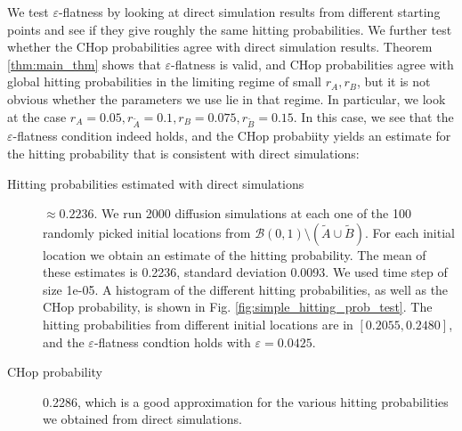 


We test $\varepsilon$-flatness by looking at direct simulation results from different starting points and see if they give roughly the same hitting probabilities. We further test whether the CHop probabilities agree with direct simulation results. Theorem \ref{thm:main_thm} shows that $\varepsilon$-flatness is valid, and CHop probabilities agree with global hitting probabilities in the limiting regime of small $r_A,r_B$, but it is not obvious whether the parameters we use lie in that regime.  In particular, we look at the case $r_A = 0.05, r_{\tilde{A}} = 0.1, r_B = 0.075, r_{\tilde{B}} = 0.15$. In this case, we see that the $\varepsilon$-flatness condition indeed holds, and the CHop probabiity yields an estimate for the hitting probability that is consistent with direct simulations:

\begin{description}
\item[Hitting probabilities estimated with direct simulations] $\approx 0.2236$. We run 2000 diffusion simulations at each one of the 100 randomly picked initial locations from $\mathcal{B}(0, 1) \setminus (\tilde{A} \cup \tilde{B})$. For each initial location we obtain an estimate of the hitting probability. The mean of these estimates is 0.2236, standard deviation 0.0093. We used time step of size 1e-05. A histogram of the different hitting probabilities, as well as the CHop probability, is shown in Fig. \ref{fig:simple_hitting_prob_test}. The hitting probabilities from different initial locations are in $[0.2055, 0.2480]$, and the $\varepsilon$-flatness condtion holds with $\varepsilon = 0.0425$.
  
\item[CHop probability]  0.2286, which is a good approximation for the various hitting probabilities we obtained from direct simulations.
\end{description}

